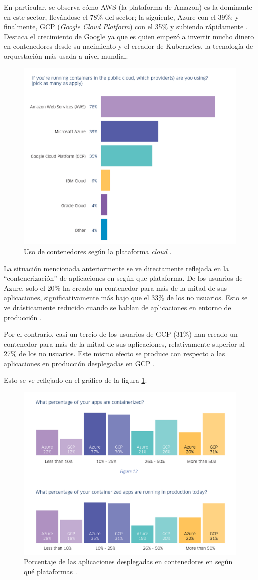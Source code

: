 En particular, se observa cómo AWS (la plataforma de Amazon) es la dominante en este
sector, llevándose el 78\% del sector; la siguiente, Azure con el 39\%; y finalmente,
GCP (\textit{Google Cloud Platform}) con el 35\% y subiendo rápidamente \cite{ContainerAdoptionTrends}.
Destaca el crecimiento de Google ya que es quien empezó a invertir mucho dinero en
contenedores desde su nacimiento y el creador de Kubernetes, la tecnología de
orquestación más usada a nivel mundial.

\begin{figure}[H]
    \centering
    \includegraphics[width=.5\linewidth]{pictures/containers-in-the-cloud.png}
    \caption{Uso de contenedores según la plataforma \textit{cloud} \cite{ContainerAdoptionTrends}.}
\end{figure}

La situación mencionada anteriormente se ve directamente reflejada en la ``contenerización''
de aplicaciones en según que plataforma. De los usuarios de Azure, solo el 20\% ha
creado un contenedor para más de la mitad de sus aplicaciones, significativamente
más bajo que el 33\% de los no usuarios. Esto se ve drásticamente reducido cuando
se hablan de aplicaciones en entorno de producción \cite{ContainerAdoptionTrends}.

Por el contrario, casi un tercio de los usuarios de GCP (31\%) han creado un contenedor
para más de la mitad de sus aplicaciones, relativamente superior al 27\% de los
no usuarios. Este mismo efecto se produce con respecto a las aplicaciones en
producción desplegadas en GCP \cite{ContainerAdoptionTrends}.

Esto se ve reflejado en el gráfico de la figura \ref{fig:contenerized-apps}:

\begin{figure}[H]
    \centering
    \includegraphics[width=.5\linewidth]{pictures/gcp-vs-azure.png}
    \caption{Porcentaje de las aplicaciones desplegadas en contenedores en según qué plataformas \cite{ContainerAdoptionTrends}.}
    \label{fig:contenerized-apps}
\end{figure}

